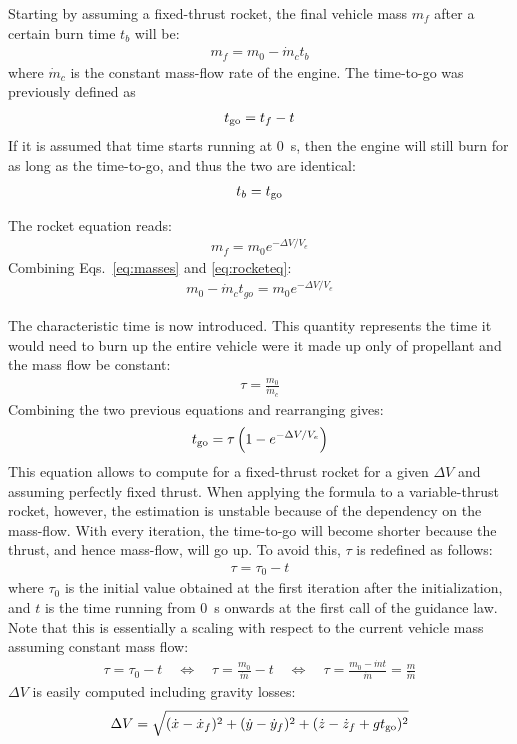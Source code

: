 \documentclass[%
]{aiaa-tc}
\begin{document}
Starting by assuming a fixed-thrust rocket, the final vehicle mass $m_f$ after a
certain burn time $t_b$ will be:
\begin{align}
    m_f = m_0 - \dot{m}_c t_b 
        \label{eq:masses}
\end{align}
where $\dot{m}_c$ is the constant mass-flow rate of the engine. The time-to-go
was previously defined as
\begin{align*}
    t_{\text{go}} = t_f - t    
\end{align*}
If it is assumed that time starts running at \SI{0}{\second}, then the engine
will still burn for as long as the time-to-go, and thus the two are identical:
\begin{align}
    t_{b} = t_{\text{go}}
\end{align}

The rocket equation reads:
\begin{align}
    m_f = m_0 e^{-\Delta V / V_e}
        \label{eq:rocketeq}
\end{align}
Combining Eqs.~\eqref{eq:masses} and \eqref{eq:rocketeq}:
\begin{align}
    m_0 - \dot{m}_c t_{go} = m_0 e^{-\Delta V/V_e}
\end{align}

The characteristic time is now introduced. This quantity represents the
time it would need to burn up the entire vehicle were it made up only of
propellant and the mass flow be constant:
\begin{align}
    \tau = \frac{m_0}{\dot{m}_c}
\end{align}
Combining the two previous equations and rearranging gives:
\begin{align}
    t_{\text{go}} = \tau \left( 1 - e^{-\Delta V/V_e} \right)
        \label{eq:tgofixedt}
\end{align}
This equation allows to compute \tgo for a fixed-thrust rocket for a given
$\Delta V$ and assuming perfectly fixed thrust. When applying the formula to a
variable-thrust rocket, however, the estimation is unstable because of the
dependency on the mass-flow. With every iteration, the time-to-go will become
shorter because the thrust, and hence mass-flow, will go up.  To avoid this,
$\tau$ is redefined as follows:
\begin{align}
    \tau = \tau_0 - t 
\end{align}
where $\tau_0$ is the initial value obtained at the first iteration after the
initialization, and $t$ is the time running from \SI{0}{\second} onwards at the
first call of the guidance law. Note that this is essentially a scaling with
respect to the current vehicle mass assuming constant mass flow:
\begin{align}
    \tau = \tau_0 - t \quad \Leftrightarrow \quad \tau = \frac{m_0}{\dot{m}} - t \quad \Leftrightarrow \quad \tau = \frac{m_0 - \dot{m} t}{\dot{m}} = \frac{m}{\dot{m}}
\end{align}
$\Delta V$ is easily computed including gravity losses:
\begin{align}
    \Delta V = \sqrt{(\dot{x} - \dot{x}_f)^2 + (\dot{y} - \dot{y}_f)^2 +
        (\dot{z} - \dot{z}_f + g t_{\text{go}})^2}
\end{align}
\end{document}
